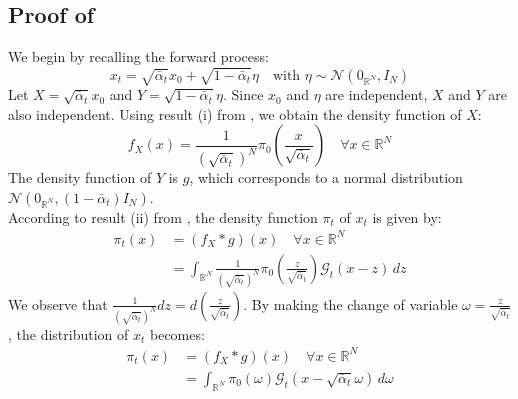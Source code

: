 \documentclass[a4paper,10pt]{article}
\begin{document}
\subsection{Proof of } \label{sec:proof_distribution_a_etap_t}
We begin by recalling the forward process:
\begin{equation*}
x_t = \sqrt{\bar{\alpha}_t} x_0 + \sqrt{1 - \bar{\alpha}_t} \eta \quad \text{with } \eta \sim \mathcal{N}(0_{\mathbb{R}^N}, I_N)
\end{equation*}
Let $X = \sqrt{\bar{\alpha}_t} x_0$ and $Y = \sqrt{1 - \bar{\alpha}_t} \eta$. Since $x_0$ and $\eta$ are independent, $X$ and $Y$ are also independent. Using result (i) from , we obtain the density function of $X$:
\begin{equation*}
f_X(x) = \frac{1}{(\sqrt{\bar{\alpha}_t})^N} \pi_0\left(\frac{x}{\sqrt{\bar{\alpha}_t}}\right) \quad \forall x \in \mathbb{R}^N
\end{equation*}
The density function of $Y$ is $g$, which corresponds to a normal distribution $\mathcal{N}(0_{\mathbb{R}^N}, (1 - \bar{\alpha}_t) I_N)$.
\\According to result (ii) from , the density function $\pi_t$ of $x_t$ is given by:
\begin{align*}
\pi_t(x) &= (f_X * g)(x) \quad \forall x \in \mathbb{R}^N \\
&= \int_{\mathbb{R}^N} \frac{1}{(\sqrt{\bar{\alpha}_t})^N} \pi_0\left(\frac{z}{\sqrt{\bar{\alpha}_t}}\right) \mathcal{G}_t(x - z) \, dz
\end{align*}
We observe that $\frac{1}{(\sqrt{\bar{\alpha}_t})^N} dz = d\left(\frac{z}{\sqrt{\bar{\alpha}_t}}\right)$. By making the change of variable $\omega = \frac{z}{\sqrt{\bar{\alpha}_t}}$, the distribution of $x_t$ becomes:
\begin{align*}
\pi_t(x) &= (f_X * g)(x) \quad \forall x \in \mathbb{R}^N \\
&= \int_{\mathbb{R}^N} \pi_0(\omega) \mathcal{G}_t(x - \sqrt{\bar{\alpha}_t} \omega) \, d\omega
\end{align*}

\end{document}
